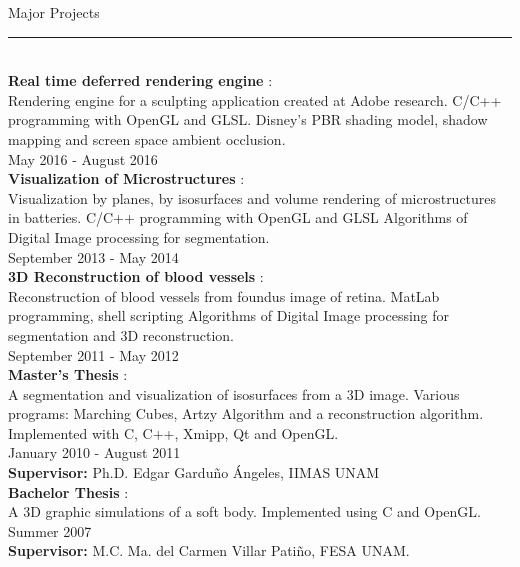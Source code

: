 \documentclass[letterpaper,10pt]{article}
\begin{document}
\begin{minipage}{0.4\textwidth} 
\vspace*{-3.0cm}
{\large{Major Projects}} \\
\textcolor{Dandelion}{\rule{0.5\textwidth}{0.05in}} \\

\textbf{Real time deferred rendering engine} : \\
Rendering engine for a sculpting application created at Adobe research.
C/C++ programming with OpenGL and GLSL.
Disney's PBR shading model, shadow mapping and screen space ambient occlusion.\\
May 2016 -  August 2016\\

\textbf{Visualization of Microstructures} : \\
Visualization by planes, by isosurfaces and volume rendering of microstructures in batteries.
C/C++ programming with OpenGL and GLSL
Algorithms of Digital Image processing for segmentation.\\
September 2013 -  May 2014\\

\textbf{3D Reconstruction of blood vessels} : \\
Reconstruction of blood vessels from foundus image of retina.
MatLab programming, shell scripting 
Algorithms of Digital Image processing for segmentation and 3D reconstruction.\\
September 2011 -  May 2012\\

\textbf{Master's Thesis} : \\
A segmentation and visualization of isosurfaces from a 3D image. Various programs: Marching Cubes,  Artzy Algorithm and  a reconstruction algorithm. Implemented with C, C++, Xmipp, Qt and OpenGL.\\
January 2010 - August 2011 \\
\textbf{Supervisor:} Ph.D. Edgar Gardu\~{n}o \'{A}ngeles, IIMAS UNAM \\

\textbf{Bachelor Thesis} : \\
A 3D graphic simulations of a soft body. Implemented using C and OpenGL. \\
Summer 2007 \\
\textbf{Supervisor:} M.C. Ma. del Carmen Villar Pati\~{n}o, FESA UNAM. \\

\vspace*{1.5cm}


\end{minipage}
\end{document}
